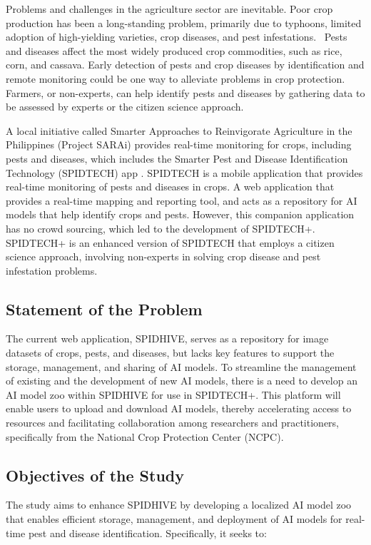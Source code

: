 \documentclass[journal]{./IEEE/IEEEtran}
\begin{document}
Problems and challenges in the agriculture sector are inevitable. Poor crop production has been a long-standing problem, primarily due to typhoons, limited adoption of high-yielding varieties, crop diseases, and pest infestations\cite{Brown_2020}.  Pests and diseases affect the most widely produced crop commodities, such as rice, corn, and cassava\cite{Balendres_2023}. Early detection of pests and crop diseases by identification and remote monitoring could be one way to alleviate problems in crop protection. Farmers, or non-experts, can help identify pests and diseases by gathering data to be assessed by experts or the citizen science approach\cite{Sullivan_Aycrigg_Barry_Bonney_Bruns_Cooper_Damoulas_Dhondt_Dietterich_Farnsworth_etal._2013}.

A local initiative called Smarter Approaches to Reinvigorate Agriculture in the Philippines (Project SARAi) provides real-time monitoring for crops, including pests and diseases, which includes the Smarter Pest and Disease Identification Technology (SPIDTECH) app \cite{Guiam_Gutierrez_Gapasin_Matalog_Ebuenga_2021}. SPIDTECH is a mobile application that provides real-time monitoring of pests and diseases in crops\cite{Guiam_Gutierrez_Gapasin_Matalog_Ebuenga_2021}. A web application that provides a real-time mapping and reporting tool, and acts as a repository for AI models that help identify crops and pests. However, this companion application has no crowd sourcing, which led to the development of SPIDTECH+. SPIDTECH+ is an enhanced version of SPIDTECH that employs a citizen science approach, involving non-experts in solving crop disease and pest infestation problems\cite{belleza-2025}.

\subsection{Statement of the Problem}
The current web application, SPIDHIVE, serves as a repository for image datasets of crops, pests, and diseases, but lacks key features to support the storage, management, and sharing of AI models. To streamline the management of existing and the development of new AI models, there is a need to develop an AI model zoo within SPIDHIVE for use in SPIDTECH+. This platform will enable users to upload and download AI models, thereby accelerating access to resources and facilitating collaboration among researchers and practitioners, specifically from the National Crop Protection Center (NCPC).

\subsection{Objectives of the Study}
The study aims to enhance SPIDHIVE by developing a localized AI model zoo that enables efficient storage, management, and deployment of AI models for real-time pest and disease identification. Specifically, it seeks to:
\end{document}
